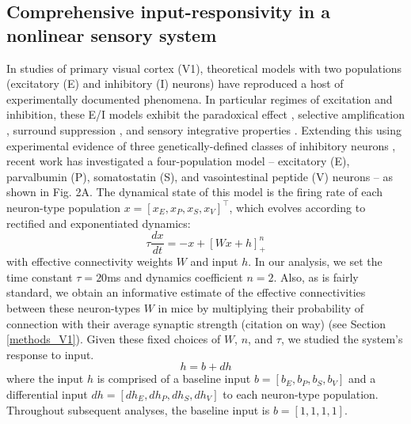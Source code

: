 \documentclass[11pt]{article}
\begin{document}
\subsection{Comprehensive input-responsivity in a nonlinear sensory system} \label{results_V1}
In studies of primary visual cortex (V1), theoretical models with two populations (excitatory (E) and inhibitory (I) neurons) have reproduced a host of experimentally documented phenomena. 
  In particular regimes of excitation and inhibition, these E/I models exhibit the paradoxical effect \cite{tsodyks1997paradoxical}, selective amplification \cite{murphy2009balanced}, surround suppression \cite{ozeki2009inhibitory}, and  sensory integrative properties \cite{rubin2015stabilized}.  
 Extending this using experimental evidence of three genetically-defined classes of inhibitory neurons \cite{markram2004interneurons, rudy2011three}, recent work \cite{litwin2016inhibitory} has investigated a four-population model --  excitatory (E), parvalbumin (P), somatostatin (S), and vasointestinal peptide (V) neurons -- as shown in Fig. 2A.
 The dynamical state of this model is the firing rate of each neuron-type population $x = \left[x_E, x_P , x_S, x_V \right]^\top$, which evolves according to rectified and exponentiated dynamics:
%
\begin{equation}
\tau \frac{dx}{dt} = -x + [W x+ h]_+^n
\end{equation}
%
with effective connectivity weights $W$ and input $h$.  In our analysis, we set the time constant $\tau = 20$ms and dynamics coefficient $n = 2$.  
Also, as is fairly standard, we obtain an informative estimate of the effective connectivities between these neuron-types $W$ in mice by multiplying their probability of connection with their average synaptic strength \cite{allen} (citation on way) (see Section \ref{methods_V1}).
Given these fixed choices of $W$, $n$, and $\tau$, we studied the system's response to input.
\begin{equation}
h = b + dh
\end{equation} 
where the input $h$ is comprised of a baseline input $b = \left[ b_E, b_P , b_S , b_V \right]$ and a differential input $dh = \left[ dh_E , dh_P , dh_S , dh_V\right]$ to each neuron-type population.  Throughout subsequent analyses, the baseline input is $b = \left[ 1 ,1,1,1\right]$. 
\end{document}
